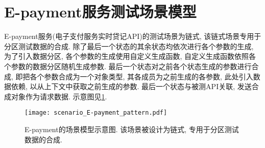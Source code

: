     \section{E-payment服务测试场景模型}
        \label{sec:epayment_scenario_model}
    
        E-payment服务(电子支付服务实时贷记API)的测试场景为链式, 该链式场景专用于分区测试数据的合成. 除了最后一个状态的其余状态均依次进行各个参数的生成, 为了引入数据分区, 各个参数的生成使用自定义生成函数, 自定义生成函数依照各个参数的数据分区随机生成参数. 最后一个状态对之前各个状态生成的参数进行合成, 即把各个参数合成为一个对象类型, 其各成员为之前生成的各参数, 此处引入数据依赖, 以从上下文中获取之前生成的参数. 最后一个状态与被测API关联, 发送合成对象作为请求数据. 示意图见\ref{fig:epayment_scenario}.
        
        \begin{figure}[!htb]
            \centering
            \texttt{[image: scenario\_E-payment\_pattern.pdf]}
            \caption[]{E-payment的场景模型示意图. 该场景被设计为链式, 专用于分区测试数据的合成.}
            \label{fig:epayment_scenario}
        \end{figure}
        